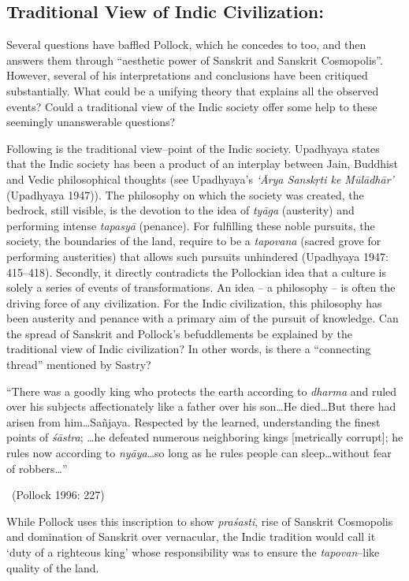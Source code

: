 \subsection*{Traditional View of Indic Civilization:}

Several questions have baffled Pollock, which he concedes to too, and then answers them through “aesthetic power of Sanskrit and Sanskrit Cosmopolis”. However, several of his interpretations and conclusions have been critiqued substantially. What could be a unifying theory that explains all the observed events? Could a traditional view of the Indic society offer some help to these seemingly unanswerable questions?

Following is the traditional view–point of the Indic society. Upadhyaya states that the Indic society has been a product of an interplay between Jain, Buddhist and Vedic philosophical thoughts (see Upadhyaya’s \textit{‘Ārya Sanskṛti ke Mūlādhār’} (Upadhyaya 1947)). The philosophy on which the society was created, the bedrock, still visible, is the devotion to the idea of \textit{tyāga} (austerity) and performing intense \textit{tapasyā} (penance). For fulfilling these noble pursuits, the society, the boundaries of the land, require to be a \textit{tapovana} (sacred grove for performing austerities) that allows such pursuits unhindered (Upadhyaya 1947: 415–418). Secondly, it directly contradicts the Pollockian idea that a culture is solely a series of events of transformations. An idea – a philosophy – is often the driving force of any civilization. For the Indic civilization, this philosophy has been austerity and penance with a primary aim of the pursuit of knowledge. Can the spread of Sanskrit and Pollock’s befuddlements be explained by the traditional view of Indic civilization? In other words, is there a “connecting thread” mentioned by Sastry?

\begin{myquote}
“There was a goodly king who protects the earth according to \textit{dharma} and ruled over his subjects affectionately like a father over his son…He died…But there had arisen from him…Sañjaya. Respected by the learned, understanding the finest points of \textit{śāstra}; …he defeated numerous neighboring kings [metrically corrupt]; he rules now according to \textit{nyāya}…so long as he rules people can sleep…without fear of robbers…” 

~\hfill (Pollock 1996: 227)
\end{myquote}

While Pollock uses this inscription to show \textit{praśasti}, rise of Sanskrit Cosmopolis and domination of Sanskrit over vernacular, the Indic tradition would call it ‘duty of a righteous king’ whose responsibility was to ensure the \textit{tapovan}–like quality of the land.

